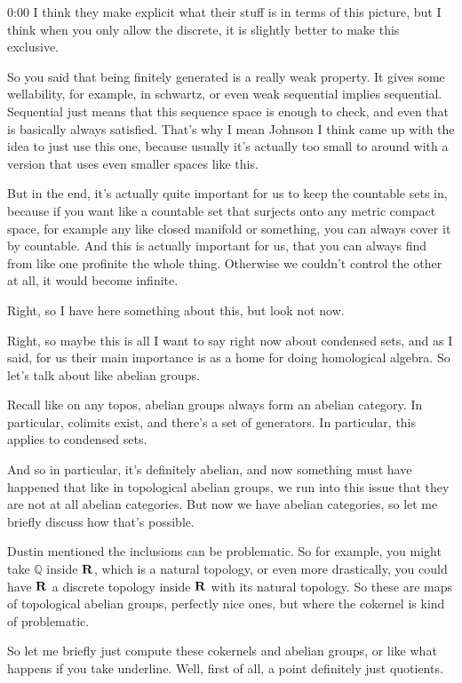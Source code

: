 \begin{unfinished}{0:00}
I think they make explicit what their stuff is in terms of this picture, but I think when you only allow the discrete, it is slightly better to make this exclusive.

So you said that being finitely generated is a really weak property. It gives some wellability, for example, in schwartz, or even weak sequential implies sequential. Sequential just means that this sequence space is enough to check, and even that is basically always satisfied. That's why I mean Johnson I think came up with the idea to just use this one, because usually it's actually too small to around with a version that uses even smaller spaces like this.

But in the end, it's actually quite important for us to keep the countable sets in, because if you want like a countable set that surjects onto any metric compact space, for example any like closed manifold or something, you can always cover it by countable. And this is actually important for us, that you can always find from like one profinite the whole thing. Otherwise we couldn't control the other at all, it would become infinite.

Right, so I have here something about this, but look not now.

Right, so maybe this is all I want to say right now about condensed sets, and as I said, for us their main importance is as a home for doing homological algebra. So let's talk about like abelian groups.

Recall like on any topos, abelian groups always form an abelian category. In particular, colimits exist, and there's a set of generators. In particular, this applies to condensed sets.

And so in particular, it's definitely abelian, and now something must have happened that like in topological abelian groups, we run into this issue that they are not at all abelian categories. But now we have abelian categories, so let me briefly discuss how that's possible.

Dustin mentioned the inclusions can be problematic. So for example, you might take $\mathbb{Q}$ inside $\mathbf R$, which is a natural topology, or even more drastically, you could have $\mathbf R$ a discrete topology inside $\mathbf R$ with its natural topology. So these are maps of topological abelian groups, perfectly nice ones, but where the cokernel is kind of problematic.

So let me briefly just compute these cokernels and abelian groups, or like what happens if you take underline. Well, first of all, a point definitely just quotients.


\end{unfinished}
